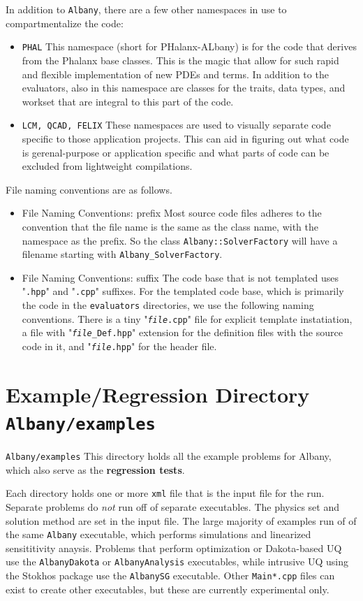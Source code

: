 \documentclass[pdf,12pt,report,strict]{SANDreport}
\theoremstyle{remark}
\begin{document}
In addition to \texttt{Albany}, there are a few other namespaces in 
use to compartmentalize the code:
\begin{itemize}
\item{\texttt{PHAL}}  This namespace (short for PHalanx-ALbany) is for the
code that derives from the Phalanx base classes. This is the magic that 
allow for such rapid and flexible implementation of new PDEs and terms.
In addition to the evaluators, also in this namespace are classes for
the traits, data types, and workset that are integral to this part of the
code.

\item{\texttt{LCM, QCAD, FELIX}} These namespaces are used to visually separate 
code specific to those application projects. This can aid in figuring out
what code is gerenal-purpose or application specific and what parts of code can
be excluded from lightweight compilations.
\end{itemize}

File naming conventions are as follows.
\begin{itemize}
\item{File Naming Conventions: prefix} Most source code files adheres to the 
convention that the file name is the same as the class name, with the namespace
as the prefix. So the class \texttt{Albany::SolverFactory} will have a filename
starting with \texttt{Albany\_SolverFactory}.

\item{File Naming Conventions: suffix} The code base that is not templated uses
"\texttt{.hpp}" and "\texttt{.cpp}" suffixes. For the templated code base, which is primarily the
code in the \texttt{evaluators} directories, we use the following naming conventions.
There is a tiny "\texttt{{\em file}.cpp}" file for
explicit template instatiation, a file with "\texttt{{\em file}\_Def.hpp}" extension
for the definition files with the source code in it, and "\texttt{{\em file}.hpp}" for
the header file.

\end{itemize}

\section{Example/Regression Directory \texttt{Albany/examples} }
\texttt{Albany/examples} This directory holds all the example problems for Albany, which 
also serve as the \textbf{regression tests}. 

Each directory holds one or more \texttt{xml} file that is
the input file for the run. Separate problems do {\em not} run off of separate executables. 
The physics set and solution method are set in the input file. The
large majority of examples run of of the same \texttt{Albany} executable, which performs simulations and
linearized sensititivity anaysis. Problems that perform optimization or Dakota-based UQ 
use the \texttt{AlbanyDakota} or \texttt{AlbanyAnalysis} executables, while intrusive UQ
using the Stokhos package use the \texttt{AlbanySG} executable. Other \texttt{Main*.cpp} files
can exist to create other executables, but these are currently experimental only.
\end{document}
